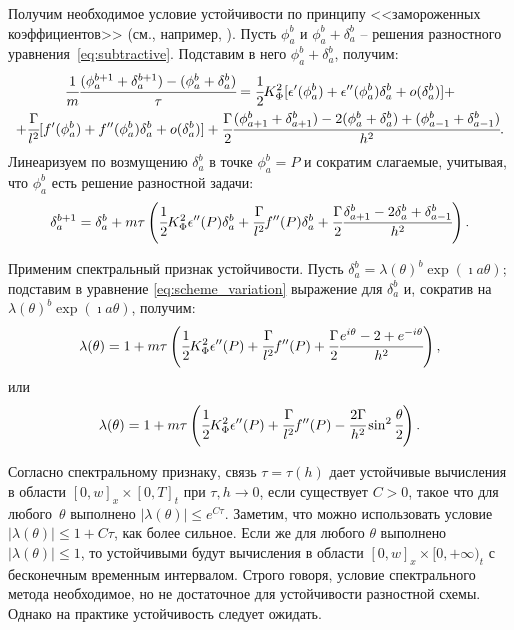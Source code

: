Получим необходимое условие устойчивости по принципу <<замороженных коэффициентов>> (см., например, \cite{bahvalov_computational_methods}). Пусть $\phi_a^b$ и $\phi_a^b + \delta_a^b$ -- решения разностного уравнения~\eqref{eq:subtractive}. Подставим в него $\phi_a^b + \delta_a^b$, получим:
\begin{multline*}
    \cfrac{1}{m} \cfrac{(\phi_a^{b + 1} + \delta_a^{b + 1}) - (\phi_a^b + \delta_a^b)}{\tau} = \cfrac{1}{2} K_\Phi^2 [\epsilon'(\phi_a^b) + \epsilon''(\phi_a^b) \delta_a^b + o(\delta_a^b)] + \\ + \cfrac{\Gamma}{l^2} [f'(\phi_a^b) + f''(\phi_a^b) \delta_a^b + o(\delta_a^b)] + \cfrac{\Gamma}{2} \cfrac{(\phi_{a + 1}^b + \delta_{a + 1}^b) - 2 (\phi_a^b + \delta_a^b) + (\phi_{a - 1}^b + \delta_{a - 1}^b)}{h^2} {\text{.}}
\end{multline*}
Линеаризуем по возмущению $\delta_a^b$ в точке $\phi_a^b = P$ и сократим слагаемые, учитывая, что $\phi_a^b$ есть решение разностной задачи:
\begin{equation}
    \delta_a^{b + 1} = \delta_a^b + m \tau \left( \cfrac{1}{2} K_\Phi^2 \epsilon''(P) \delta_a^b + \cfrac{\Gamma}{l^2} f''(P) \delta_a^b + \cfrac{\Gamma}{2} \cfrac{\delta_{a + 1}^b - 2 \delta_a^b + \delta_{a - 1}^b}{h^2} \right) {\text{.}}
    \label{eq:scheme_variation}
\end{equation} 

Применим спектральный признак устойчивости. Пусть $\delta_a^b = \lambda(\theta)^b \exp(\imath a \theta)$; подставим в уравнение \eqref{eq:scheme_variation} выражение для $\delta_a^b$ и, сократив на $\lambda(\theta)^b \exp(\imath a \theta)$, получим:
$$\lambda(\theta) = 1 + m \tau \left( \cfrac{1}{2} K_\Phi^2 \epsilon''(P) + \cfrac{\Gamma}{l^2} f''(P) + \cfrac{\Gamma}{2} \cfrac{e^{i \theta} - 2 + e^{-i \theta}}{h^2} \right) {\text{,}}$$
или
\begin{equation}
    \lambda(\theta) = 1 + m \tau \left( \cfrac{1}{2} K_\Phi^2 \epsilon''(P) + \cfrac{\Gamma}{l^2} f''(P) - \cfrac{2 \Gamma}{h^2} \sin^2 \cfrac{\theta}{2} \right) {\text{.}}
    \label{eq:spectral}
\end{equation}

Согласно спектральному признаку, связь $\tau = \tau(h)$ дает устойчивые вычисления в области $[0, w]_x \times [0, T]_t$ при $\tau, h \to 0$, если существует $C > 0$, такое что для любого~$\theta$ выполнено $|\lambda(\theta)| \leqslant e^{C\tau}$. Заметим, что можно использовать условие $|\lambda(\theta)| \leqslant 1 + C\tau$, как более сильное. Если же для любого $\theta$ выполнено $|\lambda(\theta)| \leqslant 1$, то устойчивыми будут вычисления в области $[0, w]_x \times [0, +\infty)_t$ с бесконечным временным интервалом. Строго говоря, условие спектрального метода необходимое, но не достаточное для устойчивости разностной схемы. Однако на практике устойчивость следует ожидать.

